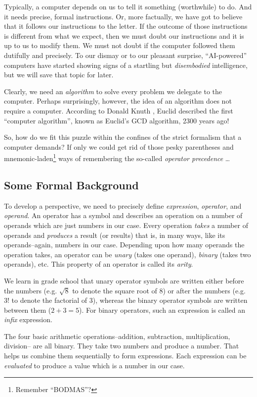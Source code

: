 \documentclass[english,smartquotes]{hgbarticle}
\begin{document}
Typically, a computer depends on us to tell it something (worthwhile) to do. And it needs precise, formal instructions. Or, more factually, we have got to believe that it follows our instructions to the letter. If the outcome of those instructions is different from what we expect, then we must doubt our instructions and it is up to us to modify them. We must not doubt if the computer followed them dutifully and precisely. To our dismay or to our pleasant surprise, ``AI-powered'' computers have started showing signs of a startling but \textit{disembodied} intelligence, but we will save that topic for later.  

Clearly, we need an \textit{algorithm} to solve every problem we delegate to the computer. Perhaps surprisingly, however, the idea of an algorithm does not require a computer. According to Donald Knuth \cite{Knuth1997}, Euclid described the first ``computer algorithm'', known as Euclid's GCD algorithm, 2300 years ago!

So, how do we fit this puzzle within the confines of the strict formalism that a computer demands? If only we could get rid of those pesky parentheses and mnemonic-laden\footnote{Remember ``BODMAS''?} ways of remembering the so-called \textit{operator precedence} \dots

\subsection{Some Formal Background}
To develop a perspective, we need to precisely define \textit{expression}, \textit{operator}, and \textit{operand}. An operator has a symbol and describes an operation on a number of operands which are just numbers in our case. Every operation \textit{takes} a number of operands and \textit{produces} a result (or results) that is, in many ways, like its operands--again, numbers in our case. Depending upon how many operands the operation takes, an operator can be \textit{unary} (takes one operand), \textit{binary} (takes two operands), etc. This property of an operator is called its \textit{arity}. 

We learn in grade school that unary operator symbols are written either before the numbers (e.g. $\sqrt 8$ to denote the square root of 8) or after the numbers (e.g. $3!$ to denote the factorial of 3), whereas the binary operator symbols are written between them ($2 + 3 = 5$). For binary operators, such an expression is called an \emph{infix} expression.

The four basic arithmetic operations--addition, subtraction, multiplication, division-- are all binary. They take two numbers and produce a number. That helps us combine them sequentially to form expressions. Each expression can be \textit{evaluated} to produce a value which is a number in our case.
\end{document}
